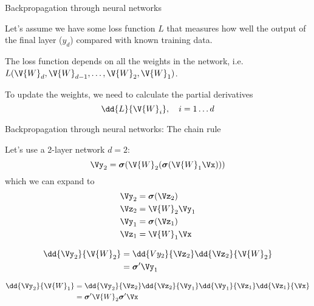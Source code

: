 \documentclass[9pt]{beamer}
\newcommand\VW{\V{W}}
\newcommand\bsigma{\boldsymbol{\sigma}}
\begin{document}
\begin{frame}{Backpropagation through neural networks}

Let's assume we have some loss function $L$ that measures how well the output of the final layer ($y_d$) compared with known training data.

\bigskip
\pause
The loss function depends on all the weights in the network, i.e.\ $L(\V{W}_d,\V{W}_{d-1},\ldots,\V{W}_2,\V{W}_1)$.

\bigskip
\pause
To update the weights, we need to calculate the partial derivatives
\[ \dd{L}{\V{W}_i},\quad i=1\ldots d \]
	
\end{frame}

\begin{frame}{Backpropagation through neural networks: The chain rule}

Let's use a 2-layer network $d=2$:
\[ \Vy_2 = \bsigma(\VW_2(\bsigma(\VW_1\Vx))) \]
which we can expand to
\begin{align*}
	 \Vy_2 &= \bsigma(\Vz_2) \\
	 \Vz_2 &= \VW_2\Vy_1 \\
	 \Vy_1 &= \bsigma(\Vz_1) \\
	 \Vz_1 &= \VW_1\Vx
\end{align*}

\begin{align*}
	\dd{\Vy_2}{\VW_2} &= \dd{Vy_2}{\Vz_2} \dd{\Vz_2}{\VW_2} \\
					  &= \bsigma' \Vy_1
\end{align*}

\begin{align*}
	\dd{\Vy_2}{\VW_1} &= \dd{\Vy_2}{\Vz_2} \dd{\Vz_2}{\Vy_1} \dd{\Vy_1}{\Vz_1} \dd{\Vz_1}{\Vx} \\
					  &= \bsigma' \VW_2 \bsigma' \Vx
\end{align*}

	
\end{frame}
\end{document}
